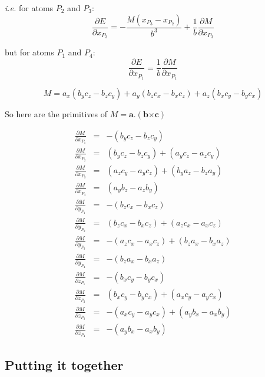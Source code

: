 \emph{i.e.} for atoms $P_2$ and $P_3$:
\begin{displaymath}
  \frac{\partial E}{\partial x_{P_3}} = -\frac{M(x_{P_3}-x_{P_2})}{b^3} + \frac{1}{b}\frac{\partial M}{\partial x_{P_3}}
\end{displaymath}

but for atoms $P_1$ and $P_4$:
\begin{displaymath}
  \frac{\partial E}{\partial x_{P_1}} =  \frac{1}{b}\frac{\partial M}{\partial x_{P_1}}
\end{displaymath}

\begin{displaymath}
  M = a_x(b_y c_z - b_z c_y) + a_y (b_z c_x - b_x c_z) + a_z (b_x c_y - b_y c_x)
\end{displaymath}

So here are the primitives of $M = \mathbf{a}.(\mathbf{b} \mathbf{\times}\mathbf{c})$

\begin{eqnarray*}
  \frac{\partial M}{\partial x_{P_1}} & = & -(b_y c_z - b_z c_y)\\
  \frac{\partial M}{\partial x_{P_2}} & = & (b_y c_z - b_z c_y) + (a_y c_z - a_z c_y)\\
  \frac{\partial M}{\partial x_{P_3}} & = & (a_z c_y - a_y c_z) + (b_y a_z - b_z a_y)\\
  \frac{\partial M}{\partial x_{P_4}} & = & (a_y b_z - a_z b_y)\\
  \frac{\partial M}{\partial y_{P_1}} & = & -(b_z c_x - b_x c_z)\\
  \frac{\partial M}{\partial y_{P_2}} & = & (b_z c_x - b_x c_z) + (a_z c_x - a_x c_z)\\
  \frac{\partial M}{\partial y_{P_3}} & = & -(a_z c_x - a_x c_z) + (b_z a_x - b_x a_z)\\
  \frac{\partial M}{\partial y_{P_4}} & = & -(b_z a_x - b_x a_z)\\
  \frac{\partial M}{\partial z_{P_1}} & = & -(b_x c_y - b_y c_x)\\
  \frac{\partial M}{\partial z_{P_2}} & = & (b_x c_y - b_y c_x) + (a_x c_y - a_y c_x)\\
  \frac{\partial M}{\partial z_{P_3}} & = & -(a_x c_y - a_y c_x) + (a_y b_x - a_x b_y)\\
  \frac{\partial M}{\partial z_{P_4}} & = & -(a_y b_x - a_x b_y)
\end{eqnarray*}

\subsection{Putting it together}

